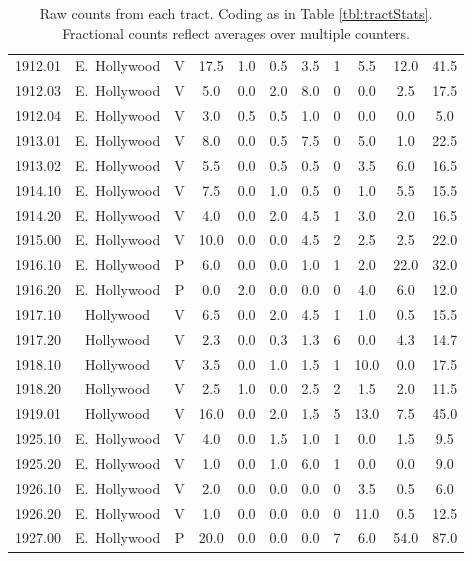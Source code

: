 \documentclass[11pt,twocolumn]{article}
\begin{document}
\begin{table}[]
\begin{tabular}{ccccccccccc}
1912.01 & E.~Hollywood & V & 17.5 &  1.0 &  0.5 &  3.5 & 1 &  5.5 & 12.0 &  41.5 \\
1912.03 & E.~Hollywood & V &  5.0 &  0.0 &  2.0 &  8.0 & 0 &  0.0 &  2.5 &  17.5 \\
1912.04 & E.~Hollywood & V &  3.0 &  0.5 &  0.5 &  1.0 & 0 &  0.0 &  0.0 &   5.0 \\
1913.01 & E.~Hollywood & V &  8.0 &  0.0 &  0.5 &  7.5 & 0 &  5.0 &  1.0 &  22.5 \\
1913.02 & E.~Hollywood & V &  5.5 &  0.0 &  0.5 &  0.5 & 0 &  3.5 &  6.0 &  16.5 \\
1914.10 & E.~Hollywood & V &  7.5 &  0.0 &  1.0 &  0.5 & 0 &  1.0 &  5.5 &  15.5 \\
1914.20 & E.~Hollywood & V &  4.0 &  0.0 &  2.0 &  4.5 & 1 &  3.0 &  2.0 &  16.5 \\
1915.00 & E.~Hollywood & V & 10.0 &  0.0 &  0.0 &  4.5 & 2 &  2.5 &  2.5 &  22.0 \\
1916.10 & E.~Hollywood & P &  6.0 &  0.0 &  0.0 &  1.0 & 1 &  2.0 & 22.0 &  32.0 \\
1916.20 & E.~Hollywood & P &  0.0 &  2.0 &  0.0 &  0.0 & 0 &  4.0 &  6.0 &  12.0 \\
1917.10 & Hollywood & V &  6.5 &  0.0 &  2.0 &  4.5 & 1 &  1.0 &  0.5 &  15.5 \\
1917.20 & Hollywood & V &  2.3 &  0.0 &  0.3 &  1.3 & 6 &  0.0 &  4.3 &  14.7 \\
1918.10 & Hollywood & V &  3.5 &  0.0 &  1.0 &  1.5 & 1 & 10.0 &  0.0 &  17.5 \\
1918.20 & Hollywood & V &  2.5 &  1.0 &  0.0 &  2.5 & 2 &  1.5 &  2.0 &  11.5 \\
1919.01 & Hollywood & V & 16.0 &  0.0 &  2.0 &  1.5 & 5 & 13.0 &  7.5 &  45.0 \\
1925.10 & E.~Hollywood & V &  4.0 &  0.0 &  1.5 &  1.0 & 1 &  0.0 &  1.5 &   9.5 \\
1925.20 & E.~Hollywood & V &  1.0 &  0.0 &  1.0 &  6.0 & 1 &  0.0 &  0.0 &   9.0 \\
1926.10 & E.~Hollywood & V &  2.0 &  0.0 &  0.0 &  0.0 & 0 &  3.5 &  0.5 &   6.0 \\
1926.20 & E.~Hollywood & V &  1.0 &  0.0 &  0.0 &  0.0 & 0 & 11.0 &  0.5 &  12.5 \\
1927.00 & E.~Hollywood & P & 20.0 &  0.0 &  0.0 &  0.0 & 7 &  6.0 & 54.0 &  87.0 \\
\bottomrule
\end{tabular}
\caption*{Raw counts from each tract. Coding as in Table \ref{tbl:tractStats}. Fractional counts
reflect averages over multiple counters.}
\label{tbl:allCount}
\end{table}
\end{document}
